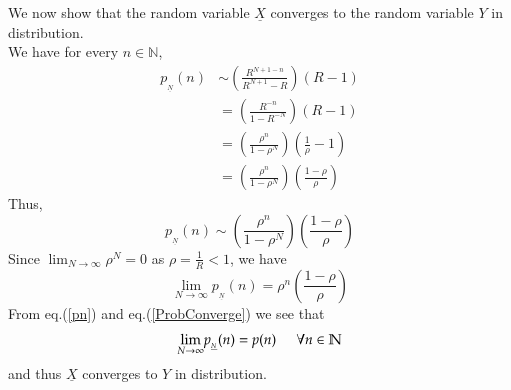 \begin{multicols}{2}
We now show that the random variable $\underline{X}$ converges to the random variable $Y$ in distribution. \\
We have for every $n \in \mathbb N$,
\begin{align}
p_{_{\underline{N}}}(n) &\sim \left(\displaystyle{\frac{R^{N+1-n}}{R^{N+1}- R}}\right)(R-1)\nonumber\\
&= \left(\displaystyle{\frac{R^{-n}}{1-R^{-N}}}\right)(R-1)\nonumber\\
&= \left(\displaystyle{\frac{\rho^{n}}{1-\rho^{N}}}\right)\left(\displaystyle{\frac{1}{\rho}}-1\right)\nonumber\\
&= \left(\displaystyle{\frac{\rho^{n}}{1-\rho^{N}}}\right)\left(\displaystyle{\frac{1-\rho}{\rho}}\right)\nonumber
\end{align}
Thus,
\begin{equation}\nonumber
p_{_{\underline{N}}}(n) \sim \left(\displaystyle{\frac{\rho^{n}}{1-\rho^{N}}}\right)\left(\displaystyle{\frac{1-\rho}{\rho}}\right)
\end{equation}
Since $\displaystyle{\lim_{N \rightarrow \infty}}\rho^N = 0$ as $\rho = \displaystyle{\frac{1}{R}} < 1$, we have
\begin{equation}
\displaystyle{\lim_{N \rightarrow \infty}}p_{_{\underline{N}}}(n) = \rho^{n}\left(\displaystyle{\frac{1-\rho}{\rho}}\right)\label{eq-12.5}
\end{equation}
From eq.(\ref{pn}) and eq.(\ref{ProbConverge}) we see that
\begin{equation}
\displaystyle{\lim_{N \rightarrow \infty}}p_{_{\underline{N}}}(n) = p(n) \hspace{0.2in} \forall n \in \mathbb N\label{eq-12.6}
\end{equation}
and thus $\underline{X}$ converges to $Y$ in distribution.


\end{multicols}
